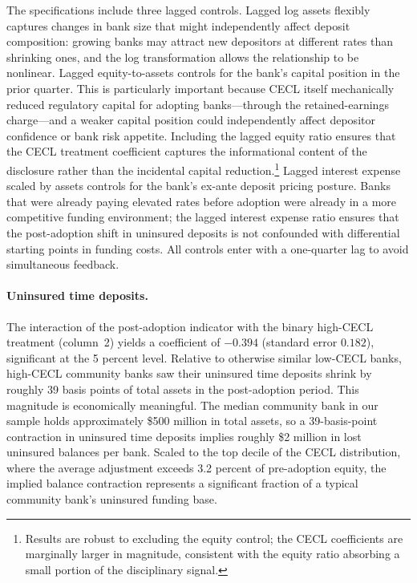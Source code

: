 The specifications include three lagged controls. Lagged log assets flexibly
captures changes in bank size that might independently affect deposit composition:
growing banks may attract new depositors at different rates than shrinking ones,
and the log transformation allows the relationship to be nonlinear. Lagged
equity-to-assets controls for the bank's capital position in the prior
quarter. This is particularly important because CECL itself mechanically reduced
regulatory capital for adopting banks---through the retained-earnings charge---and
a weaker capital position could independently affect depositor confidence or bank
risk appetite. Including the lagged equity ratio ensures that the CECL treatment
coefficient captures the informational content of the disclosure rather than the
incidental capital reduction.\footnote{Results are robust to excluding the equity
control; the CECL coefficients are marginally larger in magnitude, consistent with
the equity ratio absorbing a small portion of the disciplinary signal.} Lagged
interest expense scaled by assets controls for the bank's ex-ante deposit pricing
posture. Banks that were already paying elevated rates before adoption were
already in a more competitive funding environment; the lagged interest expense
ratio ensures that the post-adoption shift in uninsured deposits is not
confounded with differential starting points in funding costs. All controls enter
with a one-quarter lag to avoid simultaneous feedback.

\paragraph{Uninsured time deposits.}
The interaction of the post-adoption indicator with the binary high-CECL
treatment (column~2) yields a coefficient of $-0.394$ (standard error $0.182$),
significant at the 5 percent level. Relative to otherwise similar low-CECL
banks, high-CECL community banks saw their uninsured time deposits shrink by
roughly 39 basis points of total assets in the post-adoption period. This
magnitude is economically meaningful. The median community bank in our sample
holds approximately \$500 million in total assets, so a 39-basis-point
contraction in uninsured time deposits implies roughly \$2 million in lost
uninsured balances per bank. Scaled to the top decile of the CECL distribution,
where the average adjustment exceeds 3.2 percent of pre-adoption equity, the
implied balance contraction represents a significant fraction of a typical
community bank's uninsured funding base.


